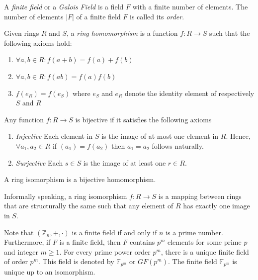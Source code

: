 \begin{defn}
\label{def:finite_field}
 A \textit{finite field} or a \textit{Galois Field} is a field $F$ with a finite number of elements. The number of elements $|F|$ of a finite field $F$ is called its \textit{order}.
\end{defn}

\begin{defn}
\label{def:ring_homomorphism}
 Given rings $R$ and $S$, a \textit{ring homomorphism} is a function $f: R \rightarrow S$ such that the following axioms hold:
 \begin{enumerate}
  \item $\forall a, b \in R: f \left( a + b \right) = f \left( a \right) + f \left( b \right)$
  \item $\forall a, b \in R: f \left( ab \right) = f \left( a \right) f \left( b \right)$
  \item $f \left( e_R \right) = f \left( e_S \right)$ where $e_S$ and $e_R$ denote the identity element of respectively $S$ and $R$
 \end{enumerate}
\end{defn}

\begin{defn}
\label{def:bijective_function} 
 Any function $f: R \rightarrow S$ is bijective if it satisfies the following axioms
 \begin{enumerate}
  \item \textit{Injective} Each element in $S$ is the image of at most one element in $R$. Hence, $\forall a_1, a_2 \in R$ if $\left( a_1 \right) = f \left( a_2 \right)$ then $a_1 = a_2$ follows naturally.
  \item \textit{Surjective} Each $s \in S$ is the image of at least one $r \in R$.
 \end{enumerate}
\end{defn}

\begin{defn}
\label{def:ring_isomorphism}
 A ring isomorphism is a bijective homomorphism.
\end{defn}

Informally speaking, a ring isomorphism $f: R \rightarrow S$ is a mapping between rings that are structurally the same such that any element of $R$ has exactly one image in $S$.

Note that $\left( \mathbb{Z}_n, +, \cdot \right)$ is a finite field if and only if $n$ is a prime number. Furthermore, if $F$ is a finite field, then $F$ contains $p^m$ elements for some prime $p$ and integer $m \geq 1$. For every prime power order $p^m$, there is a unique finite field of order $p^m$. This field is denoted by $\mathbb{F}_{p^m}$ or $GF \left( p^m \right)$. The finite field $\mathbb{F}_{p^m}$ is unique up to an isomorphism. 


